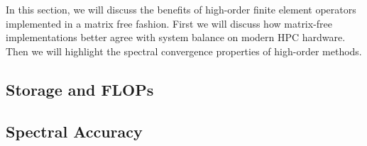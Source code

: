 In this section, we will discuss the benefits of high-order finite element operators implemented in a matrix free fashion.
First we will discuss how matrix-free implementations better agree with system balance on modern HPC hardware.
Then we will highlight the spectral convergence properties of high-order methods.

\subsection{Storage and FLOPs}\label{sec:storageandflops}


\subsection{Spectral Accuracy}

